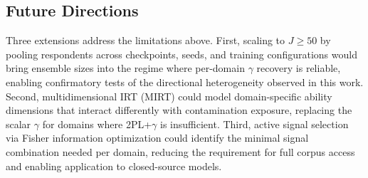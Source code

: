 \subsection{Future Directions}
\label{sec:future}

Three extensions address the limitations above. First, scaling to $J \geq 50$ by pooling respondents across checkpoints, seeds, and training configurations would bring ensemble sizes into the regime where per-domain $\gamma$ recovery is reliable, enabling confirmatory tests of the directional heterogeneity observed in this work. Second, multidimensional IRT (MIRT) could model domain-specific ability dimensions that interact differently with contamination exposure, replacing the scalar $\gamma$ for domains where 2PL+$\gamma$ is insufficient. Third, active signal selection via Fisher information optimization could identify the minimal signal combination needed per domain, reducing the requirement for full corpus access and enabling application to closed-source models.